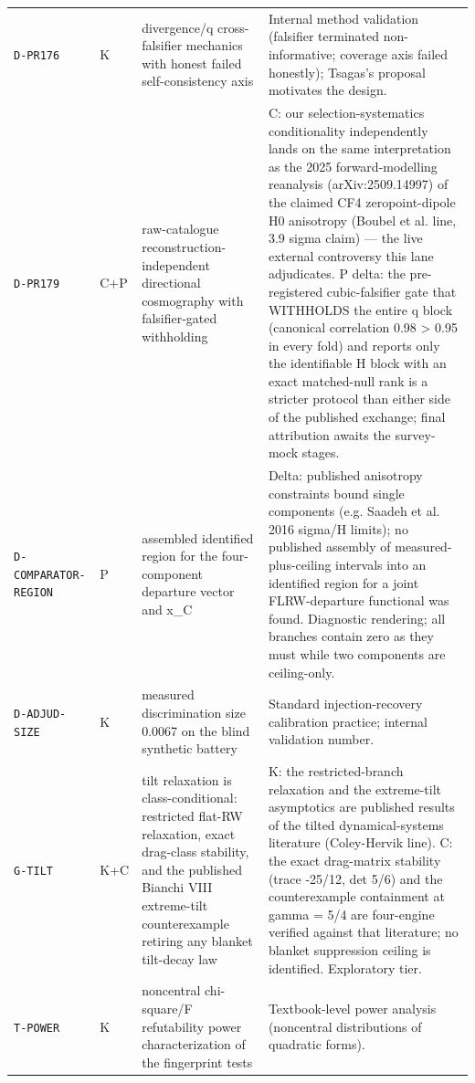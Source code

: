 \documentclass[10pt]{article}
\theoremstyle{definition}
\newcommand{\code}[1]{\texttt{\small #1}}
\begin{document}
\begin{center}
\begin{longtable}{p{2.0cm} p{0.7cm} p{5.4cm} p{6.5cm}}
\code{D-PR176} & K & divergence/q cross-falsifier mechanics with honest failed self-consistency axis & Internal method validation (falsifier terminated non-informative; coverage axis failed honestly); Tsagas's proposal motivates the design. \\[2pt]
\code{D-PR179} & C+P & raw-catalogue reconstruction-independent directional cosmography with falsifier-gated withholding & C: our selection-systematics conditionality independently lands on the same interpretation as the 2025 forward-modelling reanalysis (arXiv:2509.14997) of the claimed CF4 zeropoint-dipole H0 anisotropy (Boubel et al. line, 3.9 sigma claim) — the live external controversy this lane adjudicates. P delta: the pre-registered cubic-falsifier gate that WITHHOLDS the entire q block (canonical correlation 0.98 > 0.95 in every fold) and reports only the identifiable H block with an exact matched-null rank is a stricter protocol than either side of the published exchange; final attribution awaits the survey-mock stages. \\[2pt]
\code{D-COMPARATOR-REGION} & P & assembled identified region for the four-component departure vector and x\_C & Delta: published anisotropy constraints bound single components (e.g. Saadeh et al. 2016 sigma/H limits); no published assembly of measured-plus-ceiling intervals into an identified region for a joint FLRW-departure functional was found. Diagnostic rendering; all branches contain zero as they must while two components are ceiling-only. \\[2pt]
\code{D-ADJUD-SIZE} & K & measured discrimination size 0.0067 on the blind synthetic battery & Standard injection-recovery calibration practice; internal validation number. \\[2pt]
\code{G-TILT} & K+C & tilt relaxation is class-conditional: restricted flat-RW relaxation, exact drag-class stability, and the published Bianchi VIII extreme-tilt counterexample retiring any blanket tilt-decay law & K: the restricted-branch relaxation and the extreme-tilt asymptotics are published results of the tilted dynamical-systems literature (Coley-Hervik line). C: the exact drag-matrix stability (trace -25/12, det 5/6) and the counterexample containment at gamma = 5/4 are four-engine verified against that literature; no blanket suppression ceiling is identified. Exploratory tier. \\[2pt]
\code{T-POWER} & K & noncentral chi-square/F refutability power characterization of the fingerprint tests & Textbook-level power analysis (noncentral distributions of quadratic forms). \\[2pt]

\end{longtable}
\end{center}
\end{document}

